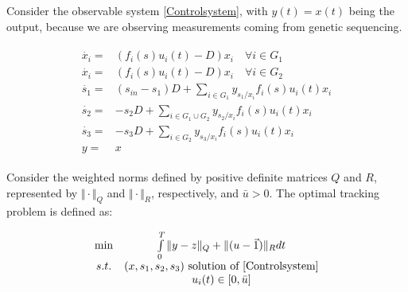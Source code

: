 \documentclass[3p,times]{article}
\begin{document}
Consider the observable system \eqref{Controlsystem}, with $y(t) = x(t)$ being the output, because we are observing measurements coming from genetic sequencing.

\begin{align} 
\label{Controlsystem}
\begin{array}{cl}
\dot{x_i} =& \left(f_i(s)u_i(t) -D \right)x_i \quad \forall i \in G_1\\
\dot{x_i} =& \left(f_i(s)u_i(t) -D \right)x_i \quad \forall i \in G_2\\
\dot{s_1} =& \displaystyle (s_{in}-s_1)D + \sum\limits_{i \in G_1}y_{s_1/x_i}f_i(s)u_i(t) x_i  \\
\dot{s_2} = & \displaystyle -s_2D+\sum\limits_{i \in G_1 \cup G_2}y_{s_2/x_i}f_i(s)u_i(t)x_i  \\
\dot{s_3} =&  \displaystyle -s_3D+\sum\limits_{i \in G_2}y_{s_3/x_i}f_i(s)u_i(t) x_i \\
y  =& x
\end{array}
\end{align}	

 Consider the weighted norms defined by positive definite matrices $Q$ and $R$, represented by $\Vert \cdot \Vert_Q$ and $\Vert \cdot \Vert_R$, respectively, and $\bar{u}>0$. The optimal tracking problem is defined as: 

\begin{align}
\label{Optimal Control} \begin{array}{cc} \min &  \int \limits_{0}^{T} \Vert y - z \Vert_Q + \Vert(u -\vec{1}) \Vert_R dt\\
s.t.& 
(x,s_1,s_2,s_3)\mbox{ solution of \eqref{Controlsystem}} \\
&u_i(t) \in [0,\bar{u}]
\end{array}	
\end{align} 
\end{document}
